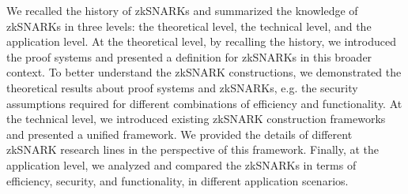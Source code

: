 \documentclass[acmtog]{acmart}
\begin{document}
We recalled the history of zkSNARKs and summarized the knowledge of zkSNARKs in three levels: the theoretical level, the technical level, and the application level.
At the theoretical level, by recalling the history, we introduced the proof systems and presented a definition for zkSNARKs in this broader context.
To better understand the zkSNARK constructions, we demonstrated the theoretical results about proof systems and zkSNARKs, e.g. the security assumptions required for different combinations of efficiency and functionality.
At the technical level, we introduced existing zkSNARK construction frameworks and presented a unified framework.
We provided the details of different zkSNARK research lines in the perspective of this framework.
Finally, at the application level, we analyzed and compared the zkSNARKs in terms of efficiency, security, and functionality, in different application scenarios.



\end{document}
